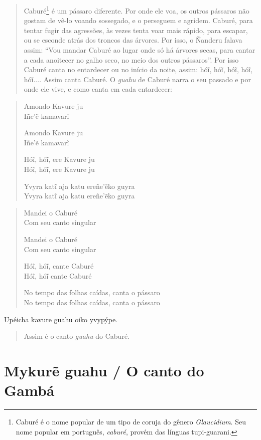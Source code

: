 \begin{itemize}
\begin{quote}
Caburé\footnote{Caburé é o nome popular de um tipo de coruja do gênero
  \emph{Glaucidium}. Seu nome popular em português, \emph{caburé},
  provém das línguas tupi-guarani.} é um pássaro diferente. Por onde ele
voa, os outros pássaros não gostam de vê-lo voando sossegado, e o
perseguem e agridem. Caburé, para tentar fugir das agressões, às vezes
tenta voar mais rápido, para escapar, ou se esconde atrás dos troncos
das árvores. Por isso, o Ñanderu falava assim: ``Vou mandar Caburé ao
lugar onde só há árvores secas, para cantar a cada anoitecer no galho
seco, no meio dos outros pássaros''. Por isso Caburé canta no entardecer
ou no início da noite, assim: hóĩ, hóĩ, hóĩ, hóĩ, hóĩ.... Assim canta
Caburé. O \emph{guahu} de Caburé narra o seu passado e por onde ele
vive, e como canta em cada entardecer:
\end{quote}

\begin{verse}
Amondo Kavure ju\\
Iñe'ẽ kamavarĩ

Amondo Kavure ju\\
Iñe'ẽ kamavarĩ

Hóĩ, hóĩ, ere Kavure ju\\
Hóĩ, hóĩ, ere Kavure ju

Yvyra katĩ aja katu ereñe'ẽko guyra\\
Yvyra katĩ aja katu ereñe'ẽko guyra
\end{verse}

\begin{verse}
Mandei o Caburé\\
Com seu canto singular

Mandei o Caburé\\
Com seu canto singular

Hóĩ, hóĩ, cante Caburé\\
Hóĩ, hóĩ cante Caburé

No tempo das folhas caídas, canta o pássaro\\
No tempo das folhas caídas, canta o pássaro
\end{verse}

Upéicha kavure guahu oiko yvypýpe.

\begin{quote}
Assim é o canto \emph{guahu} do Caburé.
\end{quote}

\chapter{Mykurẽ guahu / O canto do Gambá}


\end{itemize}
